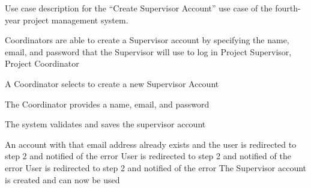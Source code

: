 \documentclass[document.tex]{subfiles}
\begin{document}
\begin{table}[!htbp]
  \centering
  \caption{Use case description for the ``Create Supervisor Account'' use case of the fourth-year project management system.}
  \label{tbl:use-case-create-supervisor}

  \begin{usecase}
    Coordinators are able to create a Supervisor account by specifying the name, email, and password that the Supervisor will use to log in
    Project Supervisor, Project Coordinator
    \ucnormal
    \begin{ucenum}
      \item A Coordinator selects to create a new Supervisor Account
      \item The Coordinator provides a name, email, and password
      \item The system validates and saves the supervisor account
    \end{ucenum}
    An account with that email address already exists and the user is redirected to step 2 and notified of the error
    User is redirected to step 2 and notified of the error
    User is redirected to step 2 and notified of the error
    The Supervisor account is created and can now be used
  \end{usecase}
\end{table}
\end{document}
